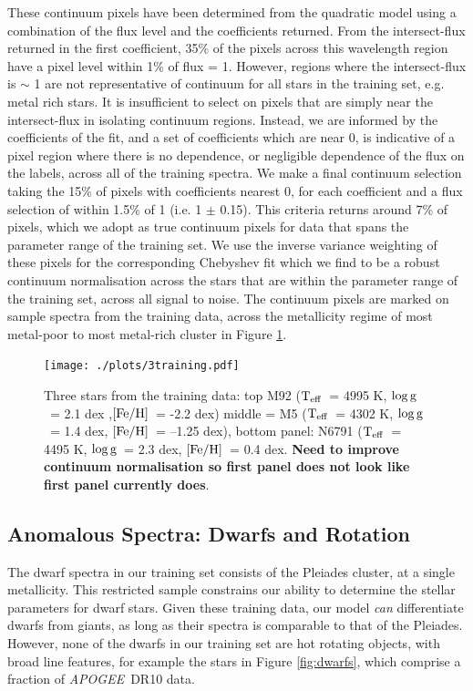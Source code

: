 \documentclass[12pt, preprint]{aastex}
\newcommand{\teff}{\mbox{$\rm T_{eff}$}}
\newcommand{\feh}{\mbox{$\rm [Fe/H]$}}
\newcommand{\logg}{\mbox{$\rm \log g$}}
\newcommand{\apogee}{\textsl{APOGEE}}
\begin{document}
These continuum pixels have been determined from the quadratic model using a combination of the flux level and the coefficients returned.  From the intersect-flux returned in the first coefficient, 35\% of the pixels across this wavelength region have a pixel level within 1\% of flux = 1. However, regions where the intersect-flux is $\sim$ 1 are not representative of continuum for all stars in the training set, e.g. metal rich stars. It is insufficient to select on pixels that are simply near the intersect-flux in isolating continuum regions. Instead, we are informed by the coefficients of the fit, and a set of coefficients which are near 0, is indicative of a pixel region where there is no dependence, or negligible dependence of the flux on the labels, across all of the training spectra. We make a final continuum selection taking the 15\% of pixels with coefficients nearest 0, for each coefficient and a flux selection of within 1.5\% of 1 (i.e. 1 $\pm$ 0.15). This criteria returns around  7\% of pixels, which we adopt as true continuum pixels for data that spans the parameter range of the training set. We use the inverse variance weighting of these pixels for the corresponding Chebyshev fit which we find to be a robust continuum normalisation across the stars that are within the parameter range of the training set, across all signal to noise. The continuum pixels are marked on sample spectra from the training data, across the metallicity regime of most metal-poor to most metal-rich cluster in Figure \ref{fig:cal_feh}.




\begin{figure}[h!]
  \texttt{[image: ./plots/3training.pdf]}
\caption{Three stars from the training data: top M92 (\teff\ = 4995 K, \logg\ = 2.1 dex ,\feh\, = -2.2 dex) middle = M5 (\teff\ = 4302 K, \logg\ = 1.4 dex, \feh\ = --1.25 dex), bottom panel: N6791 (\teff\  = 4495 K, \logg\ = 2.3 dex, \feh\ = 0.4 dex. \textbf{Need to improve continuum normalisation so first panel does not look like first panel currently does}. }
\label{fig:cal_feh}
\end{figure}




\subsection{Anomalous Spectra: Dwarfs and Rotation}

The dwarf spectra in our training set consists of the Pleiades cluster, at a single metallicity. This restricted sample constrains our ability to determine the stellar parameters for dwarf stars. Given these training data, our model \textit{can} differentiate dwarfs from giants, as long as their spectra is comparable to that of the Pleiades. However, none of the dwarfs in our training set are hot rotating objects, with broad line features, for example the stars in Figure \ref{fig:dwarfs}, which comprise a fraction of \apogee\ DR10 data. 
\end{document}
